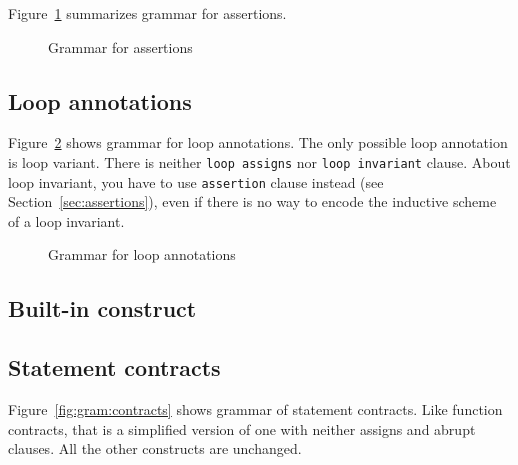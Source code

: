 Figure~\ref{fig:gram:assertions} summarizes grammar for assertions.
\begin{figure}[htbp]
  \begin{cadre}
    
  \end{cadre}
  \caption{Grammar for assertions}
  \label{fig:gram:assertions}
\end{figure}


\subsection{Loop annotations}
\label{sec:loop_annot}


Figure~\ref{fig:gram:loops} shows grammar for loop annotations. The only
possible loop annotation is loop variant. There is neither
\lstinline|loop assigns| nor \lstinline|loop invariant| clause. About loop
invariant, you have to use \lstinline|assertion| clause instead (see
Section~\ref{sec:assertions}), even if there is no way to encode the inductive
scheme of a loop invariant.
\begin{figure}[htbp]
  \begin{cadre}
    
  \end{cadre}
  \caption{Grammar for loop annotations}
  \label{fig:gram:loops}
\end{figure}


\subsection{Built-in construct \texorpdfstring{\at}{\textbackslash{}at}}
\label{sec:at}
\nodiff


\subsection{Statement contracts}
\label{sec:statement_contract}


Figure~\ref{fig:gram:contracts} shows grammar of statement contracts. Like
function contracts, that is a simplified version of \acsl one with neither
assigns and abrupt clauses. All the other constructs are unchanged.

